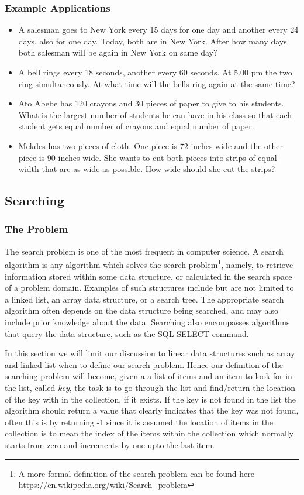 \documentclass[12pt,a4paper]{book}
\begin{document}
\subsubsection{Example Applications}
\begin{itemize}
\item A salesman goes to New York every 15 days for one day and another every 24 days, also for one day. Today, both are in New York. After how many days both salesman will be again in New York on same day?
\item A bell rings every 18 seconds, another every 60 seconds. At 5.00 pm the two ring simultaneously. At what time will the bells ring again at the same time?
\item Ato Abebe has 120 crayons and 30 pieces of paper to give to his students. What is the largest number of students he can have  in his class so that each student gets equal number of crayons and equal number of paper.
\item Mekdes has two pieces of cloth. One piece is 72 inches  wide and the other piece is 90 inches wide. She wants to cut  both pieces into strips of equal width that are as wide as  possible. How wide should she cut the strips?
\end{itemize}
\subsection{Searching}
\subsubsection{The Problem}
The search problem is one of the most frequent in computer science. A search algorithm is any algorithm which solves the search problem\footnote{A more formal definition of the search problem can be found here \url{https://en.wikipedia.org/wiki/Search_problem}}, namely, to retrieve information stored within some data structure, or calculated in the search space of a problem domain. Examples of such structures include but are not limited to a linked list, an array data structure, or a search tree. The appropriate search algorithm often depends on the data structure being searched, and may also include prior knowledge about the data. Searching also encompasses algorithms that query the data structure, such as the SQL SELECT command.
\par In this section we will limit our discussion to linear data structures such as array and linked list when to define our search problem. Hence our definition of the searching problem will become, given a a list of items and an item to look for in the list, called \textit{key}, the task is to go through the list and find/return the location of the key with in the collection, if it exists. If the key is not found in the list the algorithm should return a value that clearly indicates that the key was not found, often this is by returning -1 since it is assumed the location of items in the collection is to mean the index of the items within the collection which normally starts from zero and increments by one upto the last item.
\end{document}
